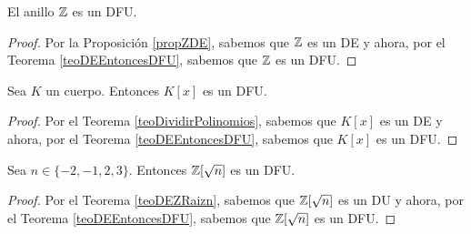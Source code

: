 \begin{coro}
    El anillo $\mathbb Z$ es un DFU.
\begin{proof}
    Por la Proposición \ref{propZDE}, sabemos que $\mathbb Z$ es un DE y ahora, por el Teorema \ref{teoDEEntoncesDFU}, sabemos
    que $\mathbb Z$ es un DFU.
\end{proof}
\end{coro}

\begin{coro}
    Sea $K$ un cuerpo. Entonces $K[x]$ es un DFU.
\begin{proof}
    Por el Teorema \ref{teoDividirPolinomios}, sabemos que $K[x]$ es un DE y ahora, por el Teorema \ref{teoDEEntoncesDFU}, sabemos
    que $K[x]$ es un DFU.
\end{proof}
\end{coro}

\begin{coro}
    Sea $n \in \{-2, -1, 2, 3\}$. Entonces $\mathbb Z[\sqrt{n}]$ es un DFU.
\begin{proof}
    Por el Teorema \ref{teoDEZRaizn}, sabemos que $\mathbb Z[\sqrt{n}]$ es un DU y ahora, por el Teorema \ref{teoDEEntoncesDFU}, sabemos
    que $\mathbb Z[\sqrt{n}]$ es un DFU.
\end{proof}
\end{coro}

